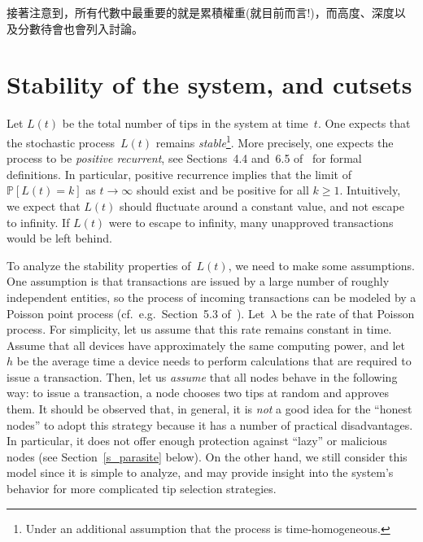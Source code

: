 \documentclass[12pt]{article}
\newcommand{\IP}{\mathbb{P}}
\begin{document}
\begin{CJK}{UTF8}{bkai}
接著注意到，所有代數中最重要的就是累積權重(就目前而言!)，而高度、深度以及分數待會也會列入討論。


\section{Stability of the system, and cutsets}
\label{s_cutsets}

Let $L(t)$ be the total number of tips 
in the system at time~$t$. One
 expects that 
the stochastic process~$L(t)$ remains \emph{stable}\footnote{Under
an additional assumption that the process is time-homogeneous.}.
More precisely, one expects the process to be \emph{positive recurrent}, see Sections~4.4 and~6.5
of~\cite{Ross_m} for formal definitions. 
In particular, positive recurrence implies that the limit of 
$\IP[L(t)=k]$ as $t\to \infty$ should
exist and be positive for all $k\geq 1$. 
Intuitively, we expect that $L(t)$ should fluctuate 
around a constant value, and not escape to infinity.
If $L(t)$ were to escape to infinity, many unapproved transactions
would be left behind.

To analyze the stability properties of~$L(t)$, we need 
to make some 
assumptions. 
One 
assumption is that
transactions are issued by a large number
of roughly independent entities, so the process of incoming
transactions can be modeled by a Poisson point process
(cf.\ e.g.\ Section~5.3 of~\cite{Ross_m}).
Let~$\lambda$ be the rate of that Poisson process.
 For simplicity, let us assume 
 that 
this rate remains constant in time. 
Assume that all devices have approximately 
the same computing power, and let~$h$ be the average
time a device needs to perform calculations
that are required to issue a transaction.
Then, let us \emph{assume} that all nodes
behave in the following way:
 to issue a transaction, a node 
  chooses
two tips at random and approves them. 
It should be observed that, in general, it is \emph{not}
a good idea for the ``honest nodes'' to adopt
this strategy because it has a number of practical
disadvantages. In particular, it does not offer enough
protection against ``lazy'' or malicious nodes
(see Section~\ref{s_parasite} below). On the other hand,
we still consider this model since it is simple to analyze,
and 
may provide insight into the system's behavior
for more complicated tip selection strategies.


\end{CJK}
\end{document}
